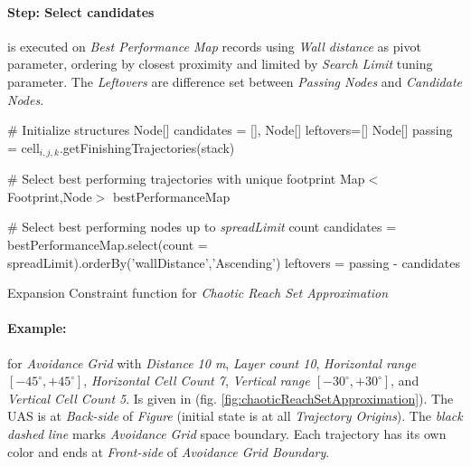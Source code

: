 \paragraph{Step: Select candidates} is executed on \emph{Best Performance Map} records using  \emph{Wall distance} as pivot parameter, ordering by closest proximity and limited by \emph{Search Limit} tuning parameter. The \emph{Leftovers} are difference set between \emph{Passing Nodes} and \emph{Candidate Nodes}. 


\begin{algorithm}[H]
    
    \BlankLine
    \# Initialize structures\;
    Node[] candidates = [], Node[] leftovers=[]\;
    Node[] passing = cell$_{i,j,k}$.getFinishingTrajectories(stack)\;
    
    \BlankLine
    \# Select best performing trajectories with unique footprint\;
    Map$<$Footprint,Node$>$  bestPerformanceMap\;
    \For{Node test $\in$ passing}{
        wallDistance= test.minimalDistanceToWall(cell$_{i,j,k}$)]\;
        footPrint = test.getFootprint(lastCells = footprintLength)\;
        \eIf{bestPerformanceMap.contains(footPrint)}{
            old = bestPerformanceMap.getByKey(footprint)\;
            oldPerformance= old.minimalDistanceToWall(cell$_{i,j,k}$)\;
            \If{oldPerformance $>$ wallDistance}{
                bestPerformanceMap.setByKey(footprint,test)\;         
            }
        }{
            bestPerformanceMap.setByKey(footprint,test)\;
        }
    }
    
    \BlankLine
    \# Select best performing nodes up to \emph{spreadLimit} count\;
    candidates = bestPerformanceMap.select(count = spreadLimit).orderBy('wallDistance','Ascending')\;
    leftovers = passing - candidates\;
    
    
    \caption{Expansion Constraint function for \emph{Chaotic Reach Set Approximation}}
    \label{alg:ExpansionConstraintFunctionForChaoticReachSet}
\end{algorithm}


\paragraph{Example:} for \emph{Avoidance Grid} with \emph{Distance 10 m}, \emph{Layer count 10}, \emph{Horizontal range $[-45^\circ,+45^\circ]$}, \emph{Horizontal Cell Count 7}, \emph{Vertical range $[-30^\circ,+30^\circ]$}, and \emph{Vertical Cell Count 5}. Is given in (fig. \ref{fig:chaoticReachSetApproximation}). The UAS is at \emph{Back-side} of \emph{Figure} (initial state is at all \emph{Trajectory Origins}). The \emph{black dashed line} marks \emph{Avoidance Grid} space boundary. Each trajectory has its own color and ends at \emph{Front-side} of \emph{Avoidance Grid Boundary}.


